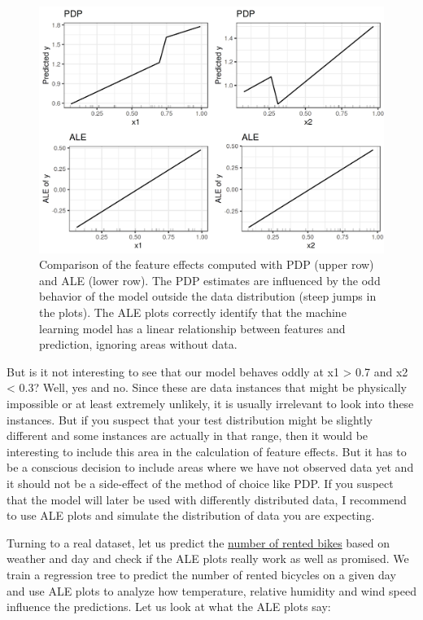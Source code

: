\documentclass[12pt,]{krantz}
\begin{document}
\begin{figure}

{\centering \includegraphics[width=\textwidth]{images/correlation-pdp-ale-plot-1} 

}

\caption{Comparison of the feature effects computed with PDP (upper row) and ALE (lower row). The PDP estimates are influenced by the odd behavior of the model outside the data distribution (steep jumps in the plots). The ALE plots correctly identify that the machine learning model has a linear relationship between features and prediction, ignoring areas without data.}\label{fig:correlation-pdp-ale-plot}
\end{figure}

But is it not interesting to see that our model behaves oddly at x1
\textgreater{} 0.7 and x2 \textless{} 0.3? Well, yes and no. Since these
are data instances that might be physically impossible or at least
extremely unlikely, it is usually irrelevant to look into these
instances. But if you suspect that your test distribution might be
slightly different and some instances are actually in that range, then
it would be interesting to include this area in the calculation of
feature effects. But it has to be a conscious decision to include areas
where we have not observed data yet and it should not be a side-effect
of the method of choice like PDP. If you suspect that the model will
later be used with differently distributed data, I recommend to use ALE
plots and simulate the distribution of data you are expecting.

Turning to a real dataset, let us predict the
\protect\hyperlink{bike-data}{number of rented bikes} based on weather
and day and check if the ALE plots really work as well as promised. We
train a regression tree to predict the number of rented bicycles on a
given day and use ALE plots to analyze how temperature, relative
humidity and wind speed influence the predictions. Let us look at what
the ALE plots say:
\end{document}
